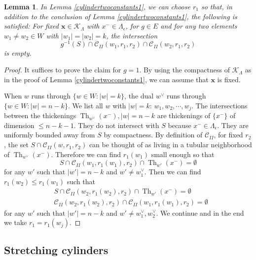 \documentclass[12pt]{amsbook}%
\newtheorem{lem}[thm]{Lemma}
\theoremstyle{definition}
\theoremstyle{remark}
\numberwithin{section}{chapter}
\numberwithin{subsection}{section}
\numberwithin{figure}{chapter}
\DeclareMathOperator{\Th}{Th}
\def\eps{\epsilon}
\def\sK{{\mathscr{K}}}
\def\Cylii{{\mathcal{C}_{II}}}
\def\bx{\mathbf{x}}
\begin{document}
{{\begin{lem}\label{disjointcyliders1}
In Lemma \ref{cylindertwoconstants1}, we can choose $r_1$ so that, in addition to the conclusion of Lemma \ref{cylindertwoconstants1}, the following is satisfied: For fixed $\bx\in \sK_\Lambda$ with $x^-\in \Lambda_\eps$, for $g\in E$ and for any two 
elements $w_1 \neq w_2 \in W$ with $|w_1|=|w_2|=k$, the intersection 
$$
g^{-1}(S)\cap \Cylii(w_1,r_1,r_2) \cap \Cylii(w_2,r_1,r_2)
$$
 is empty.
\end{lem}

\begin{proof}
It suffices to prove the claim for $g=1$. By using the compactness of $\sK_\Lambda$ as in the proof of Lemma \ref{cylindertwoconstants1}, we can assume that $\bx$ is fixed. 

When $w$ runs through $\{w\in W: \vert w\vert=k\}$, the dual $w^\vee$ runs through $\{w\in W: \vert w\vert=n-k\}$. We list all $w$ with $\vert w \vert=k$: $w_1,w_2,\cdots,w_j$. The intersections between the thickenings $\Th_{w^\vee}(x^-), \vert w\vert=n-k$ are thickenings of $\{x^-\}$ of dimension $\leq n-k-1$. They do not intersect with $S$ because $x^-\in \Lambda_\eps$. They are uniformly bounded away from $S$ by compactness. By definition of $\Cylii$, for fixed $r_2$, the set $S\cap\Cylii(w,r_1,r_2)$ can be thought of as living in a tubular neighborhood of $\Th_{w^\vee}(x^-)$. Therefore we can find $r_1(w_1)$ small enough so that 
\[
S\cap\Cylii(w_1,r_1(w_1),r_2)\cap \Th_{w'}(x^-)=\emptyset
\]
for any $w'$ such that $\vert w'\vert=n-k$ and $w'\neq w_1^\vee$. Then we can find $r_1(w_2)\leqslant r_1(w_1)$ such that 
\begin{align*}
& S\cap\Cylii(w_2,r_1(w_2),r_2)\cap \Th_{w'}(x^-)=\emptyset
\\
& \Cylii(w_2,r_1(w_2),r_2)\cap \Cylii(w_1,r_1(w_1),r_2)=\emptyset
\end{align*}
for any $w'$ such that $\vert w'\vert=n-k$ and $w'\neq w_1^\vee,w_2^\vee$. We continue and in the end we take $r_1=r_1(w_j)$. 
\end{proof}
 
 



\subsection{Stretching cylinders}

}}
\end{document}
